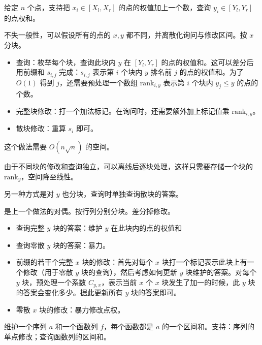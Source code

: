 \begin{example}[行加列和]
    给定 $n$ 个点，支持把 $x_i\in [X_l,X_r]$ 的点的权值加上一个数，查询 $y_i\in [Y_l,Y_r]$ 的点权和。
\end{example}
\begin{solution}
    不失一般性，可以假设所有的点的 $x,y$ 都不同，并离散化询问与修改区间。按 $x$ 分块。
    \begin{itemize}
        \item 查询：枚举每个块，查询此块内 $y$ 在 $[Y_l,Y_r]$ 的点的权值和。这可以差分后用前缀和 $s_{i,j}$ 完成：$s_{i,j}$ 表示第 $i$ 个块内 $y$ 排名前 $j$ 的点的权值和。为了 $O(1)$ 得到 $j$，还需要预处理一个数组 $\mathrm{rank}_{i,y}$ 表示第 $i$ 个块内 $y_j\le y$ 的点的个数。
        \item 完整块修改：打一个加法标记。在询问时，还需要额外加上标记值乘 $\mathrm{rank}_{i,y}$。
        \item 散块修改：重算 $s_{i}$ 即可。
    \end{itemize}
    这个做法需要 $O(n\sqrt{n})$ 的空间。
\end{solution}
\begin{solution}[压空间]
    由于不同块的修改和查询独立，可以离线后逐块处理，这样只需要存储一个块的 $\mathrm{rank}_y$，空间降至线性。

    另一种方式是对 $y$ 也分块，查询时单独查询散块的答案。
\end{solution}
\begin{solution}[另解]
    是上一个做法的对偶。按行列分别分块。差分掉修改。
    \begin{itemize}
        \item 查询完整 $y$ 块的答案：维护 $y$ 在此块内的点的权值和
        \item 查询零散 $y$ 块的答案：暴力。
        \item 前缀的若干个完整 $x$ 块的修改：首先对每个 $x$ 块打一个标记表示此块上有一个修改（用于零散 $y$ 块的查询），然后考虑如何更新 $y$ 块维护的答案。对每个 $y$ 块，预处理一个系数 $C_{y,x}$，表示当前 $x$ 个 $x$ 块发生了加一的时候，此 $y$ 块的答案会变化多少。据此更新所有 $y$ 块的答案即可。
        \item 零散 $x$ 块的修改：暴力修改点权。
    \end{itemize}
\end{solution}

\begin{exercise}
    维护一个序列 $a$ 和一个函数列 $f$，每个函数都是 $a$ 的一个区间和。支持：序列的单点修改；查询函数列的区间和。
\end{exercise}

